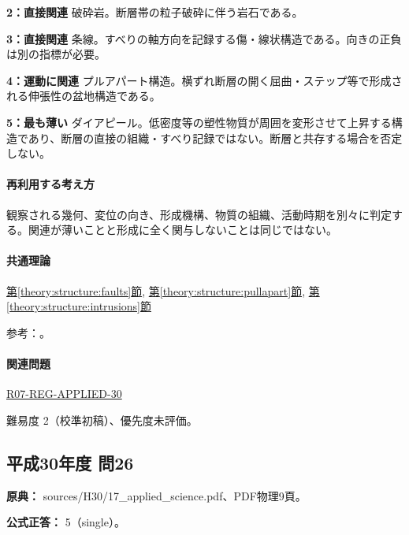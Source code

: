 \noindent\textbf{2：直接関連} 破砕岩。断層帯の粒子破砕に伴う岩石である。\par

\noindent\textbf{3：直接関連} 条線。すべりの軸方向を記録する傷・線状構造である。向きの正負は別の指標が必要。\par

\noindent\textbf{4：運動に関連} プルアパート構造。横ずれ断層の開く屈曲・ステップ等で形成される伸張性の盆地構造である。\par

\noindent\textbf{5：最も薄い} ダイアピール。低密度等の塑性物質が周囲を変形させて上昇する構造であり、断層の直接の組織・すべり記録ではない。断層と共存する場合を否定しない。\par

\paragraph{再利用する考え方} 観察される幾何、変位の向き、形成機構、物質の組織、活動時期を別々に判定する。関連が薄いことと形成に全く関与しないことは同じではない。

\paragraph{共通理論} \hyperref[theory:structure:faults]{第\ref*{theory:structure:faults}節}, \hyperref[theory:structure:pullapart]{第\ref*{theory:structure:pullapart}節}, \hyperref[theory:structure:intrusions]{第\ref*{theory:structure:intrusions}節}

\par 参考：\cite{str_faultrocks,str_diapir}。

\paragraph{関連問題} \hyperref[q:r07-reg-applied-30]{R07-REG-APPLIED-30}

\par 難易度 2（校準初稿）、優先度未評価。

\subsection{平成30年度 問26}
\label{q:h30-reg-applied-26}

\noindent\textbf{原典：} sources/H30/17\_applied\_science.pdf、PDF物理9頁。

\textbf{公式正答：} 5（single）。

